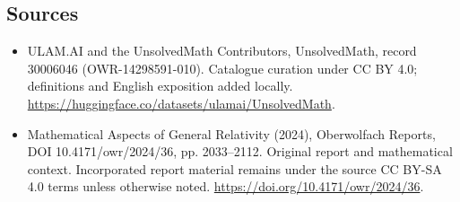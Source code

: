 \documentclass[11pt]{article}
\begin{document}
\subsection{Sources}
\begin{itemize}
\item[\hypertarget{source:30006046:1}{S1}] ULAM.AI and the UnsolvedMath Contributors, UnsolvedMath, record 30006046 (OWR-14298591-010). Catalogue curation under CC BY 4.0; definitions and English exposition added locally.
\url{https://huggingface.co/datasets/ulamai/UnsolvedMath}.
\item[\hypertarget{source:30006046:2}{S2}] Mathematical Aspects of General Relativity (2024), Oberwolfach Reports, DOI 10.4171/owr/2024/36, pp. 2033--2112. Original report and mathematical context. Incorporated report material remains under the source CC BY-SA 4.0 terms unless otherwise noted.
\url{https://doi.org/10.4171/owr/2024/36}.
\end{itemize}
\label{end:30006046}
\end{document}
